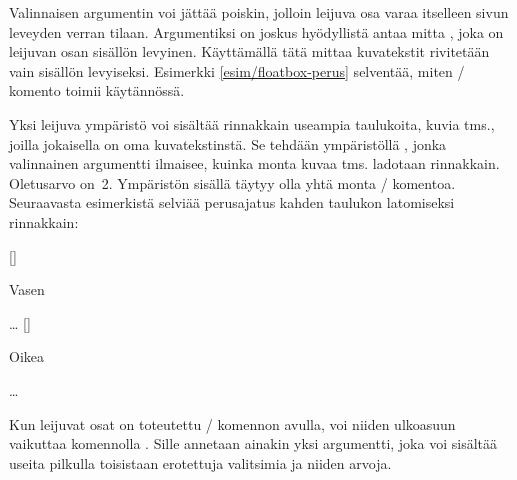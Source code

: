 Valinnaisen argumentin  voi jättää poiskin, jolloin
leijuva osa varaa itselleen sivun leveyden verran tilaan. Argumentiksi
on joskus hyödyllistä antaa mitta , joka on leijuvan osan
sisällön levyinen. Käyttämällä tätä mittaa kuvatekstit rivitetään vain
sisällön levyiseksi. Esimerkki \ref{esim/floatbox-perus} selventää,
miten \-/ komento toimii käytännössä.

Yksi leijuva ympäristö voi sisältää rinnakkain useampia taulukoita,
kuvia tms., joilla jokaisella on oma kuvatekstinstä. Se tehdään
ympäristöllä , jonka valinnainen argumentti
ilmaisee, kuinka monta kuvaa tms. ladotaan rinnakkain. Oletusarvo on~2.
Ympäristön sisällä täytyy olla yhtä monta \-/
komentoa. Seuraavasta esimerkistä selviää perusajatus kahden taulukon
latomiseksi rinnakkain:

\begin{koodilohkosis}
\begin{table}
  \begin{floatrow}[2]  %
    [\FBwidth]{\caption{Vasen}}{…}
    [\FBwidth]{\caption{Oikea}}{…}
  \end{floatrow}
\end{table}
\end{koodilohkosis}

Kun leijuvat osat on toteutettu \-/ komennon avulla,
voi niiden ulkoasuun vaikuttaa komennolla . Sille
annetaan ainakin yksi argumentti, joka voi sisältää useita pilkulla
toisistaan erotettuja valitsimia ja niiden arvoja.

\begin{koodilohkosis}
\end{koodilohkosis}

